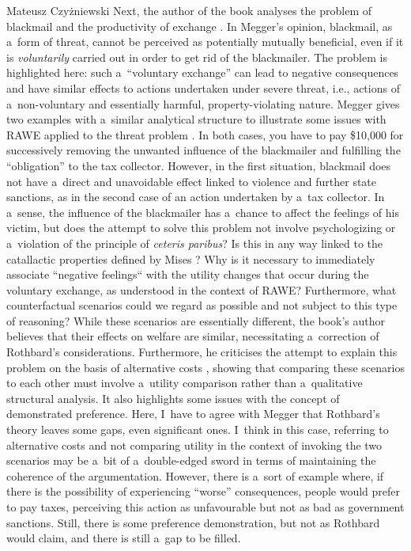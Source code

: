 \begin{newrevengenv}{Mateusz Czyżniewski}
Next, the author of the book analyses the problem of blackmail and the productivity of exchange 
\parencite[][pp.62–67]{megger_sprawiedliwosc_2021}. %
 In Megger's opinion, blackmail, as a~form of threat, cannot be perceived as potentially mutually beneficial, even if it is \textit{voluntarily} carried out in order to get rid of the blackmailer. The problem is highlighted here: such a~``voluntary exchange'' can lead to negative consequences and have similar effects to actions undertaken under severe threat, i.e., actions of a~non-voluntary and essentially harmful, property-violating nature. Megger gives two examples with a~similar analytical structure to illustrate some issues with RAWE applied to the threat problem 
\parencite[][p.63]{megger_sprawiedliwosc_2021}. %
 In both cases, you have to pay \$10,000 for successively removing the unwanted influence of the blackmailer and fulfilling the ``obligation'' to the tax collector. However, in the first situation, blackmail does not have a~direct and unavoidable effect linked to violence and further state sanctions, as in the second case of an action undertaken by a~tax collector. In a~sense, the influence of the blackmailer has a~chance to affect the feelings of his victim, but does the attempt to solve this problem not involve psychologizing or a~violation of the principle of \textit{ceteris paribus}? Is this in any way linked to the catallactic properties defined by Mises 
\parencite*[][pp.233–257]{mises_human_1998}? %
 Why is it necessary to immediately associate ``negative feelings`` with the utility changes that occur during the voluntary exchange, as understood in the context of RAWE? Furthermore, what counterfactual scenarios could we regard as possible and not subject to this type of reasoning? While these scenarios are essentially different, the book's author believes that their effects on welfare are similar, necessitating a~correction of Rothbard's considerations. Furthermore, he criticises the attempt to explain this problem on the basis of alternative costs 
\parencite[][p.64]{megger_sprawiedliwosc_2021}, %
 showing that comparing these scenarios to each other must involve a~utility comparison rather than a~qualitative structural analysis. It also highlights some issues with the concept of demonstrated preference. Here, I~have to agree with Megger that Rothbard's theory leaves some gaps, even significant ones. I~think in this case, referring to alternative costs and not comparing utility in the context of invoking the two scenarios may be a~bit of a~double-edged sword in terms of maintaining the coherence of the argumentation. However, there is a~sort of example where, if there is the possibility of experiencing ``worse'' consequences, people would prefer to pay taxes, perceiving this action as unfavourable but not as bad as government sanctions. Still, there is some preference demonstration, but not as Rothbard would claim, and there is still a~gap to be filled.




\end{newrevengenv}
